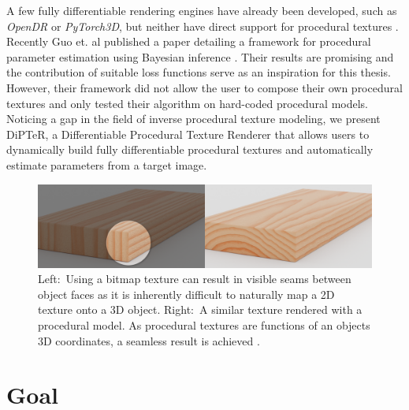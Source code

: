 A few fully differentiable rendering engines have already been developed, such as \textit{OpenDR} or \textit{PyTorch3D}, but neither have direct support for procedural textures \cite{loper_2014_opendr, facebookresearch_2020_facebookresearchpytorch3d}. Recently Guo et. al published a paper detailing a framework for procedural parameter estimation using Bayesian inference \cite{guo_2019_a}. Their results are promising and the contribution of suitable loss functions serve as an inspiration for this thesis. However, their framework did not allow the user to compose their own procedural textures and only tested their algorithm on hard-coded procedural models. Noticing a gap in the field of inverse procedural texture modeling, we present DiPTeR, a Differentiable Procedural Texture Renderer that allows users to dynamically build fully differentiable procedural textures and automatically estimate parameters from a target image. 


\begin{figure}
    \centering
    \includegraphics[width=\textwidth]{img/theory/PlaneOrNotAPlane.png}
    \caption{Left$:$ Using a bitmap texture can result in visible seams between object faces as it is inherently difficult to naturally map a 2D texture onto a 3D object. Right$:$ A similar texture rendered with a procedural model. As procedural textures are functions of an objects 3D coordinates, a seamless result is achieved \cite{_comparison}.}
    \label{fig:BitmapVsProcedural}
\end{figure}

\section{Goal}

